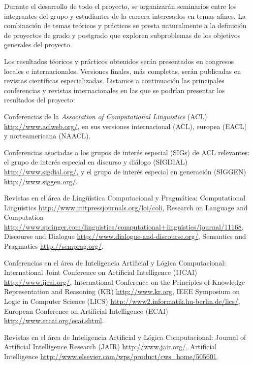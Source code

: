 
Durante el desarrollo de todo el proyecto, se organizar\'an seminarios
entre los integrantes del grupo y estudiantes de la carrera
interesados en temas afines.  La combinaci\'on de temas te\'oricos y
pr\'acticos se presta naturalmente a la definici\'on de proyectos de
grado y postgrado que exploren subproblemas de los objetivos generales del proyecto.

Los resultados t\'eoricos y pr\'acticos obtenidos ser\'an presentados en
congresos locales e internacionales.  Versiones finales, m\'as
completas, ser\'an publicadas en revistas cient\'ificas especializadas.
Listamos a continuaci\'on las principales conferencias y revistas
internacionales en las que se podr\'ian presentar los resultados del proyecto:

\begin{myitemize}
\item Conferencias de la \emph{Association of Computational Linguistics}
(ACL) \url{http://www.aclweb.org/}, en sus versiones internacional (ACL),
europea (EACL) y norteamericana (NAACL).

\item Conferencias asociadas a los grupos de inter\'es especial (SIGs) de
ACL relevantes: el grupo de inter\'es especial en discurso y di\'alogo
(SIGDIAL) \url{http://www.sigdial.org/}, y el grupo de inter\'es especial en
generaci\'on (SIGGEN) \url{http://www.siggen.org/}.

\item Revistas en el \'area de Ling\"u\'istica Computacional y Pragm\'atica:
Computational Linguistics
\url{http://www.mitpressjournals.org/loi/coli}, Research on Language and Computation
\url{http://www.springer.com/linguistics/computational+linguistics/journal/11168},
Discourse and Dialogue \url{http://www.dialogue-and-discourse.org/},
Semantics and Pragmatics \url{http://semprag.org/}.

\item Conferencias en el \'area de Inteligencia Artificial y L\'ogica
Computacional:
International Joint Conference on Artificial Intelligence (IJCAI)
\url{http://www.ijcai.org/}, International Conference on the Principles of
Knowledge Representation and Reasoning (KR) \url{http://www.kr.org},
IEEE Symposium on Logic in Computer Science
(LICS) \url{http://www2.informatik.hu-berlin.de/lics/},
European Conference on Artificial Intelligence (ECAI) \url{http://www.eccai.org/ecai.shtml}.

\item Revistas en el \'area de Inteligencia Artificial y L\'ogica
Computacional: Journal of Artificial Intelligence Research (JAIR)
\url{http://www.jair.org/}, Artificial Intelligence
\url{http://www.elsevier.com/wps/product/cws_home/505601}.


\end{myitemize}
